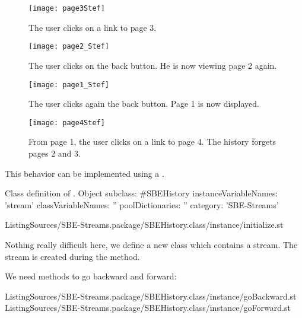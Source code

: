 \documentclass[a4paper,10pt,twoside]{book}
\begin{document}
\begin{figure}[!ht]
\centerline{\texttt{[image: page3Stef]}}
\caption{The user clicks on a link to page 3.}
\label{fig:page3}
\vspace{.2in}
\end{figure}

\begin{figure}[!ht]
\centerline{\texttt{[image: page2\_Stef]}}
\caption{The user clicks on the back button. He is now viewing page 2 again.}
\label{fig:page2_}
\vspace{.2in}
\end{figure}

\begin{figure}[!ht]
\centerline{\texttt{[image: page1\_Stef]}}
\caption{The user clicks again the back button. Page 1 is now displayed.}
\label{fig:page1_}
\vspace{.2in}
\end{figure}

\begin{figure}[!ht]
\centerline{\texttt{[image: page4Stef]}}
\caption{From page 1, the user clicks on a link to page 4. The history forgets pages 2 and 3.}
\label{fig:page4}
\vspace{.2in}
\end{figure}

This behavior can be implemented using a .

\begin{code}{Class definition of .}
Object subclass: #SBEHistory
	instanceVariableNames: 'stream'
	classVariableNames: ''
	poolDictionaries: ''
	category: 'SBE-Streams'
\end{code}

\clearpage

%
{ListingSources/SBE-Streams.package/SBEHistory.class/instance/initialize.st}

Nothing really difficult here, we define a new class which contains a stream.
The stream is created during the  method.

We need methods to go backward and forward:

%
{ListingSources/SBE-Streams.package/SBEHistory.class/instance/goBackward.st}
%
{ListingSources/SBE-Streams.package/SBEHistory.class/instance/goForward.st}
\end{document}
